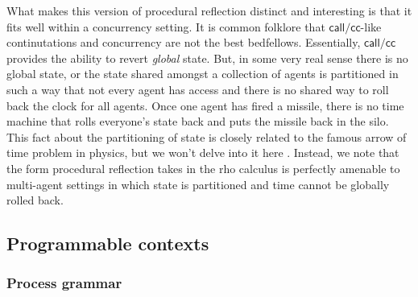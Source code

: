 

What makes this version of procedural reflection distinct and
interesting is that it fits well within a concurrency setting. It is
common folklore that $\mathsf{call/cc}$-like continutations and
concurrency are not the best bedfellows. Essentially,
$\mathsf{call/cc}$ provides the ability to revert \emph{global}
state. But, in some very real sense there is no global state, or the
state shared amongst a collection of agents is partitioned in such a
way that not every agent has access and there is no shared way to roll
back the clock for all agents. Once one agent has fired a missile,
there is no time machine that rolls everyone's state back and puts the
missile back in the silo. This fact about the partitioning of state is
closely related to the famous arrow of time problem in physics, but we
won't delve into it here \cite{enwiki:1234510214}. Instead, we note
that the form procedural reflection takes in the rho calculus is
perfectly amenable to multi-agent settings in which state is
partitioned and time cannot be globally rolled back.

\subsection{Programmable contexts}
\subsubsection{Process grammar}\label{subsub:process_grammar}

